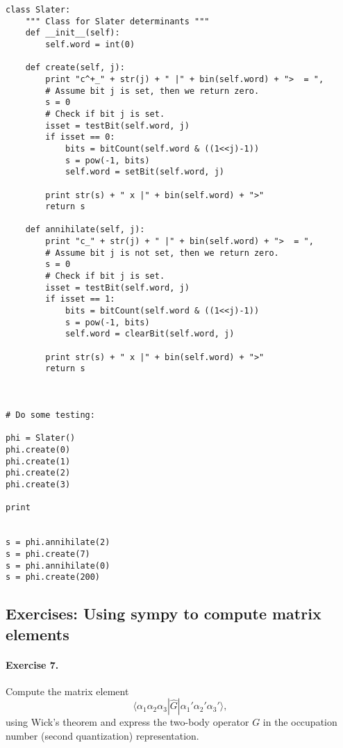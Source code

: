 \documentclass[%
twoside,                 %
final,                   %
10pt]{article}
\begin{document}
\begin{verbatim}
class Slater:
    """ Class for Slater determinants """
    def __init__(self):
        self.word = int(0)

    def create(self, j):
        print "c^+_" + str(j) + " |" + bin(self.word) + ">  = ",
        # Assume bit j is set, then we return zero.
        s = 0
        # Check if bit j is set.
        isset = testBit(self.word, j)
        if isset == 0:
            bits = bitCount(self.word & ((1<<j)-1))
            s = pow(-1, bits)
            self.word = setBit(self.word, j)

        print str(s) + " x |" + bin(self.word) + ">"
        return s
        
    def annihilate(self, j):
        print "c_" + str(j) + " |" + bin(self.word) + ">  = ",
        # Assume bit j is not set, then we return zero.
        s = 0
        # Check if bit j is set.
        isset = testBit(self.word, j)
        if isset == 1:
            bits = bitCount(self.word & ((1<<j)-1))
            s = pow(-1, bits)
            self.word = clearBit(self.word, j)

        print str(s) + " x |" + bin(self.word) + ">"
        return s



# Do some testing:

phi = Slater()
phi.create(0)
phi.create(1)
phi.create(2)
phi.create(3)

print


s = phi.annihilate(2)
s = phi.create(7)
s = phi.annihilate(0)
s = phi.create(200)

\end{verbatim}

    


\subsection*{Exercises: Using sympy to compute matrix elements}

\paragraph{Exercise 7.}
Compute the matrix element
\[
\langle\alpha_{1}\alpha_{2}\alpha_{3}|\hat{G}|\alpha_{1}'\alpha_{2}'\alpha_{3}'\rangle,
\]
using Wick's theorem and express the two-body operator
$G$ in the occupation number (second quantization) 
representation.
\end{document}
